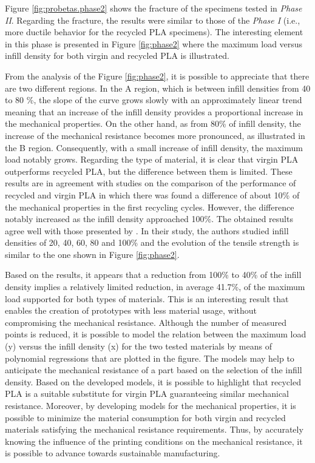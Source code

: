 \documentclass[]{interact}
\theoremstyle{plain}%
\theoremstyle{definition}
\theoremstyle{remark}
\begin{document}
Figure \ref{fig:probetas.phase2} shows the fracture of the specimens
tested in \emph{Phase II}. Regarding the fracture, the results were
similar to those of the \emph{Phase I} (i.e., more ductile behavior for
the recycled PLA specimens). The interesting element in this phase is
presented in Figure \ref{fig:phase2} where the maximum load versus
infill density for both virgin and recycled PLA is illustrated.

From the analysis of the Figure \ref{fig:phase2}, it is possible to
appreciate that there are two different regions. In the A region, which
is between infill densities from 40 to 80 \%, the slope of the curve
grows slowly with an approximately linear trend meaning that an increase
of the infill density provides a proportional increase in the mechanical
properties. On the other hand, as from 80\% of infill density, the
increase of the mechanical resistance becomes more pronounced, as
illustrated in the B region. Consequently, with a small increase of
infill density, the maximum load notably grows. Regarding the type of
material, it is clear that virgin PLA outperforms recycled PLA, but the
difference between them is limited. These results are in agreement with
studies on the comparison of the performance of recycled and virgin PLA
\citep{CruzSanchez2017} in which there was found a difference of about
10\% of the mechanical properties in the first recycling cycles.
However, the difference notably increased as the infill density
approached 100\%. The obtained results agree well with those presented
by \citet{Wang2020h}. In their study, the authors studied infill
densities of 20, 40, 60, 80 and 100\% and the evolution of the tensile
strength is similar to the one shown in Figure \ref{fig:phase2}.

Based on the results, it appears that a reduction from 100\% to 40\% of
the infill density implies a relatively limited reduction, in average
41.7\%, of the maximum load supported for both types of materials. This
is an interesting result that enables the creation of prototypes with
less material usage, without compromising the mechanical resistance.
Although the number of measured points is reduced, it is possible to
model the relation between the maximum load (y) versus the infill
density (x) for the two tested materials by means of polynomial
regressions that are plotted in the figure. The models may help to
anticipate the mechanical resistance of a part based on the selection of
the infill density. Based on the developed models, it is possible to
highlight that recycled PLA is a suitable substitute for virgin PLA
guaranteeing similar mechanical resistance. Moreover, by developing
models for the mechanical properties, it is possible to minimize the
material consumption for both virgin and recycled materials satisfying
the mechanical resistance requirements. Thus, by accurately knowing the
influence of the printing conditions on the mechanical resistance, it is
possible to advance towards sustainable manufacturing.
\end{document}
